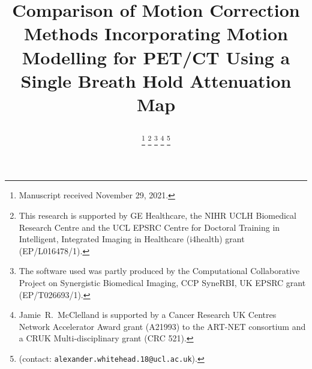 \documentclass[10pt, twocolumn, twoside, letterpaper]{IEEEtran}
\begin{document}
\title{

    Comparison of Motion Correction Methods Incorporating Motion Modelling for PET/CT Using a Single Breath Hold Attenuation Map
}

\pagestyle{plain}

\author{
    
        
    
            

    \thanks{Manuscript received November 29, 2021.}
    \thanks{This research is supported by GE Healthcare, the NIHR UCLH Biomedical Research Centre and the UCL EPSRC Centre for Doctoral Training in Intelligent, Integrated Imaging in Healthcare (i4health) grant (EP/L016478/1).}
    \thanks{The software used was partly produced by the Computational Collaborative Project on Synergistic Biomedical Imaging, CCP SyneRBI, UK EPSRC grant (EP/T026693/1).}
    \thanks{Jamie~R.~McClelland is supported by a Cancer Research UK Centres Network Accelerator Award grant (A21993) to the ART-NET consortium and a CRUK Multi-disciplinary grant (CRC 521).}
    \thanks{(contact: \texttt{alexander.whitehead.18@ucl.ac.uk}).}
}
\end{document}
